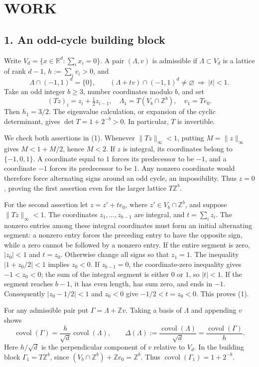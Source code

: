 \section{WORK}
\subsection{1. An odd-cycle building block}
Write $V_d=\{x\in\mathbb R^d:\sum_i x_i=0\}$. A pair $(\Lambda,v)$ is
admissible if $\Lambda\subset V_d$ is a lattice of rank $d-1$,
$h:=\sum_i v_i>0$, and
\[
 \Lambda\cap(-1,1)^d=\{0\},\qquad
 (\Lambda+t v)\cap(-1,1)^d\ne\varnothing\ \Longrightarrow\ |t|<1.
 \tag{1}
\]
Take an odd integer $b\geq3$, number coordinates modulo $b$, and set
\[
 (Tz)_i=z_i+\tfrac12z_{i-1},\quad
 \Lambda_1=T(V_b\cap\mathbb Z^b),\quad v_1=Te_0.
\]
Then $h_1=3/2$. The eigenvalue calculation, or expansion of the cyclic
determinant, gives $\det T=1+2^{-b}>0$. In particular, $T$ is invertible.

We check both assertions in (1). Whenever $\|Tz\|_\infty<1$, putting
$M=\|z\|_\infty$ gives $M<1+M/2$, hence $M<2$. If $z$ is integral,
its coordinates belong to $\{-1,0,1\}$. A coordinate equal to $1$ forces
its predecessor to be $-1$, and a coordinate $-1$ forces its predecessor
to be $1$. Any nonzero coordinate would therefore force alternating
signs around an odd cycle, an impossibility. Thus $z=0$, proving the
first assertion even for the larger lattice $T\mathbb Z^b$.

For the second assertion let $z=z'+t e_0$, where $z'\in V_b\cap\mathbb
Z^b$, and suppose $\|Tz\|_\infty<1$. The coordinates $z_1,\ldots,z_{b-1}$
are integral, and $t=\sum_i z_i$. The nonzero entries among these integral
coordinates must form an initial alternating segment: a nonzero entry
forces the preceding entry to have the opposite sign, while a zero
cannot be followed by a nonzero entry. If the entire segment is zero,
$|z_0|<1$ and $t=z_0$. Otherwise change all signs so that $z_1=1$.
The inequality $|1+z_0/2|<1$ implies $z_0<0$. If $z_{b-1}=0$, the
coordinate-zero inequality gives $-1<z_0<0$; the sum of the integral
segment is either $0$ or $1$, so $|t|<1$. If the segment reaches
$b-1$, it has even length, has sum zero, and ends in $-1$. Consequently
$|z_0-1/2|<1$ and $z_0<0$ give $-1/2<t=z_0<0$. This proves (1).

For any admissible pair put $\Gamma=\Lambda+\mathbb Zv$. Taking a basis
of $\Lambda$ and appending $v$ shows
\[
 \operatorname{covol}(\Gamma)
 =\frac{h}{\sqrt d}\operatorname{covol}(\Lambda),\qquad
 \Delta(\Lambda):=\frac{\operatorname{covol}(\Lambda)}{\sqrt d}
 =\frac{\operatorname{covol}(\Gamma)}h.                 \tag{2}
\]
Here $h/\sqrt d$ is the perpendicular component of $v$ relative to
$V_d$. In the building block $\Gamma_1=T\mathbb Z^b$, since
$(V_b\cap\mathbb Z^b)+\mathbb Ze_0=\mathbb Z^b$. Thus
$\operatorname{covol}(\Gamma_1)=1+2^{-b}$.


